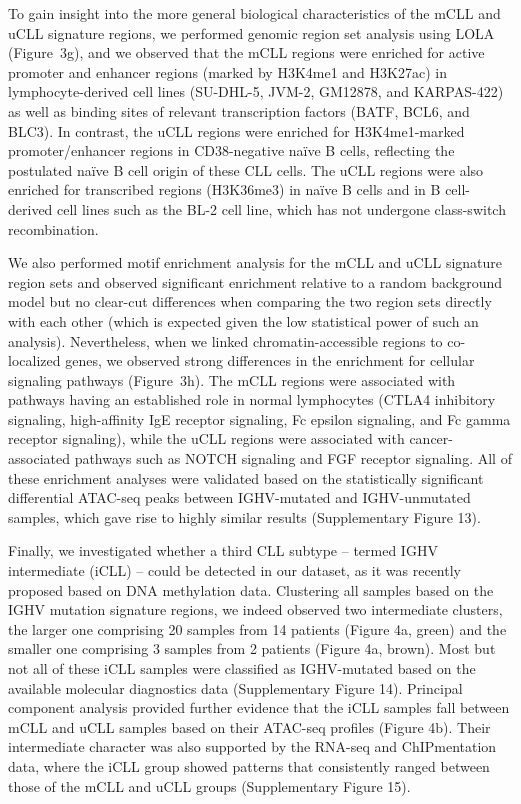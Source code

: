 \documentclass[10pt,]{article}
\begin{document}
To gain insight into the more general biological characteristics of the
mCLL and uCLL signature regions, we performed genomic region set
analysis using LOLA\citep{Sheffield2015} (Figure~3g), and we observed
that the mCLL regions were enriched for active promoter and enhancer
regions (marked by H3K4me1 and H3K27ac) in lymphocyte-derived cell lines
(SU-DHL-5, JVM-2, GM12878, and KARPAS-422) as well as binding sites of
relevant transcription factors (BATF, BCL6, and BLC3). In contrast, the
uCLL regions were enriched for H3K4me1-marked promoter/enhancer regions
in CD38-negative naïve B cells, reflecting the postulated naïve B cell
origin of these CLL cells\citep{Forconi2010}. The uCLL regions were also
enriched for transcribed regions (H3K36me3) in naïve B cells and in B
cell-derived cell lines such as the BL-2 cell line, which has not
undergone class-switch recombination.

We also performed motif enrichment analysis for the mCLL and uCLL
signature region sets and observed significant enrichment relative to a
random background model but no clear-cut differences when comparing the
two region sets directly with each other (which is expected given the
low statistical power of such an analysis). Nevertheless, when we linked
chromatin-accessible regions to co-localized genes, we observed strong
differences in the enrichment for cellular signaling pathways
(Figure~3h). The mCLL regions were associated with pathways having an
established role in normal lymphocytes (CTLA4 inhibitory signaling,
high-affinity IgE receptor signaling, Fc epsilon signaling, and Fc gamma
receptor signaling), while the uCLL regions were associated with
cancer-associated pathways such as NOTCH signaling and FGF receptor
signaling. All of these enrichment analyses were validated based on the
statistically significant differential ATAC-seq peaks between
IGHV-mutated and IGHV-unmutated samples, which gave rise to highly
similar results (Supplementary Figure 13).

Finally, we investigated whether a third CLL subtype -- termed IGHV
intermediate (iCLL) -- could be detected in our dataset, as it was
recently proposed based on DNA methylation
data\citep{Kulis2012, Queiros2014}. Clustering all samples based on the
IGHV mutation signature regions, we indeed observed two intermediate
clusters, the larger one comprising 20 samples from 14 patients (Figure
4a, green) and the smaller one comprising 3 samples from 2 patients
(Figure 4a, brown). Most but not all of these iCLL samples were
classified as IGHV-mutated based on the available molecular diagnostics
data (Supplementary Figure 14). Principal component analysis provided
further evidence that the iCLL samples fall between mCLL and uCLL
samples based on their ATAC-seq profiles (Figure 4b). Their intermediate
character was also supported by the RNA-seq and ChIPmentation data,
where the iCLL group showed patterns that consistently ranged between
those of the mCLL and uCLL groups (Supplementary Figure 15).
\end{document}
